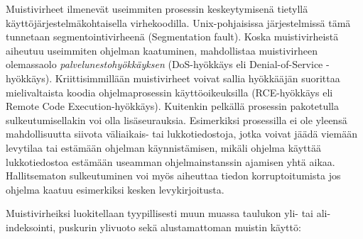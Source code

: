 Muistivirheet ilmenevät useimmiten prosessin keskeytymisenä tietyllä
käyt\-tö\-jär\-jes\-tel\-mä\-koh\-tai\-sel\-la virhekoodilla.
Unix-pohjaisissa järjestelmissä tämä tunnetaan segmentointivirheenä (Segmentation fault).
Koska muistivirheistä aiheutuu useimmiten ohjelman kaatuminen,
mahdollistaa muistivirheen olemassaolo \emph{palvelunestohyökkäyksen} (DoS-hyökkäys eli Denial-of-Service -hyökkäys).
Kriittisimmillään muistivirheet voivat sallia hyökkääjän suorittaa mielivaltaista koodia
ohjelmaprosessin käyttöoikeuksilla (RCE-hyökkäys eli Remote Code Execution-hyökkäys).
Kuitenkin pelkällä prosessin pakotetulla sulkeutumisellakin voi olla lisäseurauksia.
Esimerkiksi prosessilla ei ole yleensä mahdollisuutta siivota väliaikais- tai lukkotiedostoja,
jotka voivat jäädä viemään levytilaa tai estämään ohjelman käyn\-nis\-tä\-mi\-sen,
mikäli ohjelma käyttää lukkotiedostoa es\-tä\-mään useamman ohjelmainstanssin ajamisen yhtä aikaa.
Hallitsematon sulkeutuminen voi myös aiheuttaa tiedon korruptoitumista jos ohjelma kaatuu esimerkiksi kesken levykirjoitusta.

Muistivirheiksi luokitellaan tyypillisesti muun muassa
taulukon yli- tai ali- indeksointi, puskurin ylivuoto sekä alustamattoman muistin käyttö:

